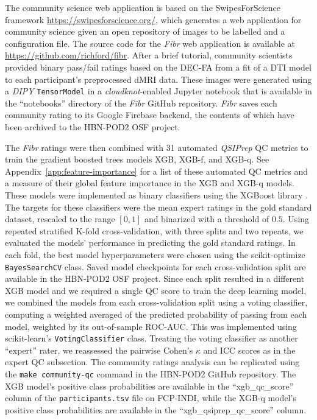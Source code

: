 \documentclass[9pt,lineno]{elife}
\begin{document}
The community science web application is based on the SwipesForScience framework
\url{https://swipesforscience.org/}, which generates a web application for
community science given an open repository of images to be labelled and a
configuration file. The source code for the \emph{Fibr} web application is
available at \url{https://github.com/richford/fibr}. After a brief tutorial,
community scientists provided binary pass/fail ratings based on the DEC-FA from
a fit of a DTI model to each participant's preprocessed dMRI data. These images were
generated using a \emph{DIPY} \citep{dipy} \texttt{TensorModel} in a
\emph{cloudknot}-enabled Jupyter notebook that is available in the ``notebooks''
directory of the \emph{Fibr} GitHub repository. \emph{Fibr} saves each community
rating to its Google Firebase backend, the contents of which have been archived
to the HBN-POD2 OSF project.

The \emph{Fibr} ratings were then combined with 31 automated \emph{QSIPrep} QC
metrics to train the gradient boosted trees models XGB, XGB-f, and XGB-q. See Appendix~\ref{app:feature-importance} for a list of these automated QC metrics and a measure of their global feature importance in the XGB and XGB-q models. These
models were implemented as binary classifiers using the XGBoost library
\citep{xgboost}. The targets for these classifiers were the mean expert ratings
in the gold standard dataset, rescaled to the range $[0, 1]$ and binarized with
a threshold of $0.5$. Using repeated
stratified K-fold cross-validation, with three splits and two repeats, we
evaluated the models' performance in predicting the gold standard ratings. In
each fold, the best model hyperparameters were chosen using the scikit-optimize
\citep{scikit-optimize} \texttt{BayesSearchCV} class. Saved model checkpoints for
each cross-validation split are available in the HBN-POD2 OSF project. Since
each split resulted in a different XGB model and we required a single QC score
to train the deep learning model, we combined the models from each
cross-validation split using a voting classifier, computing a weighted averaged
of the predicted probability of passing from each model, weighted by its
out-of-sample ROC-AUC. This was implemented using scikit-learn's
\texttt{VotingClassifier} class. Treating the voting classifier as another
``expert'' rater, we reassessed the pairwise Cohen's $\kappa$ and ICC scores as
in the expert QC subsection. The community ratings analysis can be replicated
using the \texttt{make community-qc} command in the HBN-POD2 GitHub repository.
The XGB model's positive class probabilities are available in the
``xgb\_qc\_score'' column of the \texttt{participants.tsv} file on FCP-INDI, while
the XGB-q model's positive class probabilities are available in the
``xgb\_qsiprep\_qc\_score'' column.
\end{document}
